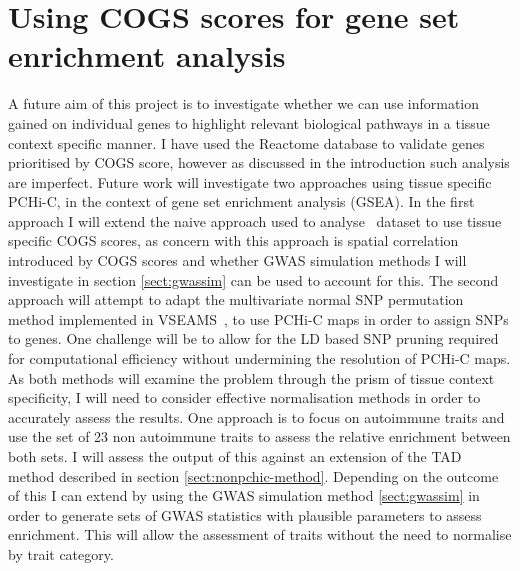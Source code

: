\documentclass[a4paper,11pt]{report}
\begin{document}
\section{Using COGS scores for gene set enrichment analysis}
A future aim of this project is to investigate whether we can use information gained on individual genes to highlight relevant biological pathways in a tissue context specific manner. I have used the Reactome database to validate genes prioritised by COGS score, however as discussed in the introduction such analysis are imperfect. Future work will investigate two approaches using tissue specific PCHi-C, in the context of gene set enrichment analysis (GSEA). In the first approach I will extend the naive approach used to analyse~\citet{PetersLyonsLeeEtAl2016} dataset to use tissue specific COGS scores, as concern with this approach is spatial correlation introduced by COGS scores and whether GWAS simulation methods I will investigate in section \ref{sect:gwassim} can be used to account for this. The second approach will attempt to adapt the multivariate normal SNP permutation method implemented in VSEAMS~\citep{Burren2014-vh}, to use PCHi-C maps in order to assign SNPs to genes. One challenge will be to allow for the LD based SNP pruning  required for computational efficiency without undermining the resolution of PCHi-C maps. As both methods will examine the problem through the prism of tissue context specificity, I will need to consider effective normalisation methods in order to accurately assess the results. One approach is to focus on autoimmune traits and use the set of 23 non autoimmune traits to assess the relative enrichment between both sets. I will assess the output of this against an extension of the TAD method described in section \ref{sect:nonpchic-method}. Depending on the outcome of this I can extend by using the GWAS simulation method \ref{sect:gwassim} in order to generate sets of GWAS statistics with plausible parameters to assess enrichment. This will allow the assessment of traits without the need to normalise by trait category. 





\end{document}
